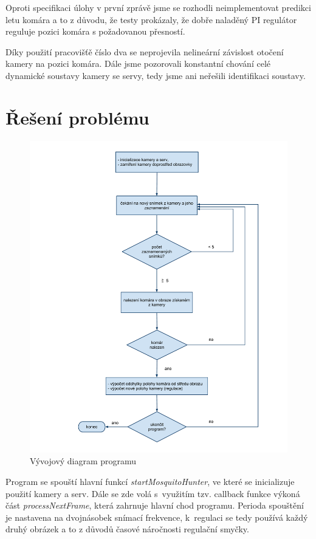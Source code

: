 \documentclass[a4paper,10pt]{article}
\begin{document}
		Oproti specifikaci úlohy v první zprávě jsme se rozhodli neimplementovat predikci letu komára 
		a to z důvodu, že testy prokázaly, že dobře naladěný PI regulátor reguluje pozici komára s požadovanou 
		přesností.

		Díky použití pracovišťě číslo dva se neprojevila nelineární závislost otočení kamery na pozici komára. 
		Dále jsme pozorovali konstantní chování celé dynamické soustavy kamery se servy, tedy jsme ani neřešili 
		identifikaci soustavy.
		
\section{Řešení problému}

		\begin{figure}[!h]
			\centering
			 \includegraphics[width=1\columnwidth]{pics/vyvojovy_diagram_programu}
			 \caption{Vývojový diagram programu}\label{fig:Diagram_programu}
		\end{figure}


		Program se spouští hlavní funkcí \textit{startMosquitoHunter}, ve které se inicializuje 
		použití kamery a serv.
		Dále se zde volá s~využitím tzv. callback funkce výkoná část \textit{processNextFrame}, která zahrnuje hlavní chod
		programu. Perioda spouštění je nastavena na dvojnásobek snímací frekvence, k~regulaci se tedy používá každý druhý obrázek a to z důvodů časové náročnosti regulační smyčky.
\end{document}

